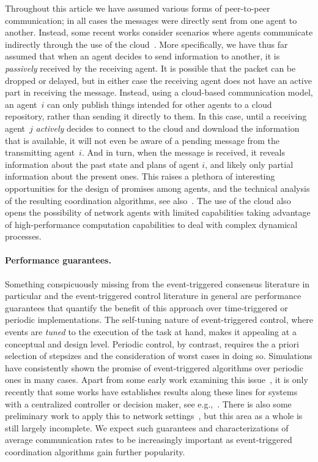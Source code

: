 \documentclass{autart}
\begin{document}
{Throughout this article we have assumed various forms of peer-to-peer
communication; in all cases the messages were directly sent from one
agent to another. Instead, some recent works consider scenarios where
agents communicate indirectly through the use of the
cloud~\citep{AA-DL-DVD-KHJ:15,SLB-CN-GJP:16,AA-DL-DVD-KHJ:17}.
{More specifically, we have thus far assumed that when an agent
  decides to send information to another, it is \emph{passively}
  received by the receiving agent. It is possible that the packet can
  be dropped or delayed, but in either case the receiving agent does
  not have an active part in receiving the message. Instead, using a
  cloud-based communication model, an agent~$i$ can only publish
  things intended for other agents to a cloud repository, rather than
  sending it directly to them. In this case, until a receiving
  agent~$j$ \emph{actively} decides to connect to the cloud and
  download the information that is available, it will not even be
  aware of a pending message from the transmitting agent~$i$. And in
  turn, when the message is received, it reveals information about the
  past state and plans of agent $i$, and likely only partial
  information about the present ones. This raises a plethora of
  interesting opportunities for the design of promises among agents,
  and the technical analysis of the resulting coordination algorithms,
  see also~\citep{CN-JC:16-tac}. The use of the cloud also opens the
  possibility of network agents with limited capabilities taking
  advantage of high-performance computation capabilities to deal with
  complex dynamical processes.}

\paragraph*{Performance guarantees.}
Something conspicuously missing from the event-triggered consensus
literature in particular and the event-triggered control literature in
general are performance guarantees that quantify the benefit of this
approach over time-triggered or periodic implementations.  The
self-tuning nature of event-triggered control, where events are
\emph{tuned} to the execution of the task at hand, makes it appealing
at a conceptual and design level.  Periodic control, by contrast,
requires the a priori selection of stepsizes and the consideration of
worst cases in doing so.  Simulations have consistently shown the
promise of event-triggered algorithms over periodic ones in many
cases. Apart from some early work examining this
issue~\cite{KJA-BMB:99,KJA-BMB:02}, it is only recently that some
works have establishes results along these lines for systems with a
centralized controller or decision maker, see
e.g.,~\citep{DA-WPMHH:14,VSD-DPB-WPMHH:17,BAK-DJA-WPMHH:17,BAK-DJA-WPMHH:18,PO-JC:18}. There
is also some preliminary work to apply this to network
settings~\citep{CR-HS-KHJ:16,DPB-RG-WPMHHL:17,SHJH-DPB-WPMHH:17}, but
this area as a whole is still largely incomplete. We expect such
guarantees and characterizations of average communication rates to be
increasingly important as event-triggered coordination algorithms gain
further popularity.

}
\end{document}
